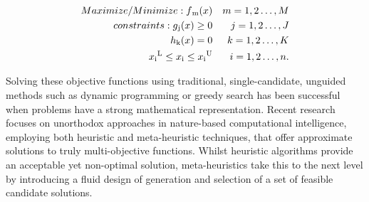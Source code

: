\documentclass[conference]{IEEEtran}
\theoremstyle{definition}
\begin{document}
{\scriptsize
    \begin{align}
    \label{e1}
    Maximize/Minimize:f\textsubscript{m}(x)& &  m = 1,2\dots,M \\
    constraints:g\textsubscript{j}(x) \ge 0& & j=1,2\dots,J \nonumber\\
    h\textsubscript{k}(x) = 0& & k=1,2\dots,K \nonumber\\
    x\textsubscript{i}\textsuperscript{L} \le x\textsubscript{i} \le x\textsubscript{i}\textsuperscript{U} && i = 1,2\dots,n.\nonumber 
    \end{align}
}%

Solving these objective functions using traditional, single-candidate, unguided methods such as dynamic programming or greedy search has been successful when problems have a strong mathematical representation. Recent research focuses on unorthodox approaches in nature-based computational intelligence, employing both heuristic and meta-heuristic techniques, that offer approximate solutions to truly multi-objective functions. Whilst heuristic algorithms provide an acceptable yet non-optimal solution, meta-heuristics take this to the next level by introducing a fluid design of generation and selection of a set of feasible candidate solutions.  

% 
\end{document}
